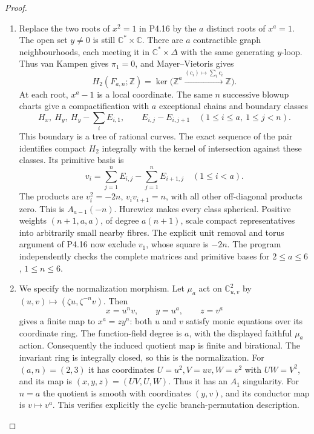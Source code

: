 \begin{proof}

\begin{enumerate}[label={$\langle1\rangle$\arabic*.},leftmargin=*]
\item Replace the two roots of $x^2=1$ in P4.16 by the $a$ distinct
roots of $x^a=1$. The open set $y\ne0$ is still
$\mathbb C^*\times\mathbb C$. There are $a$ contractible graph
neighbourhoods, each meeting it in $\mathbb C^*\times\Delta$
with the same generating $y$-loop. Thus van Kampen gives
$\pi_1=0$, and Mayer--Vietoris gives
\[
 H_2(F_{a,n};\mathbb Z)=\ker\bigl(\mathbb Z^a
   \xrightarrow{(c_i)\mapsto\sum_i c_i}\mathbb Z\bigr).
\]
At each root, $x^a-1$ is a local coordinate. The same $n$
successive blowup charts give a compactification with $a$
exceptional chains and boundary classes
\[
 H_x,\ H_y,\ H_y-\sum_i E_{i,1},\qquad
 E_{i,j}-E_{i,j+1}\quad(1\leq i\leq a,\ 1\leq j<n).
\]
This boundary is a tree of rational curves. The exact sequence
of the pair identifies compact $H_2$ integrally with the kernel
of intersection against these classes. Its primitive basis is
\[
 v_i=\sum_{j=1}^n E_{i,j}-\sum_{j=1}^n E_{i+1,j}
       \quad(1\leq i<a).
\]
The products are $v_i^2=-2n$, $v_iv_{i+1}=n$, with all other
off-diagonal products zero. This is $A_{a-1}(-n)$.
Hurewicz makes every class spherical. Positive weights
$(n+1,a,a)$, of degree $a(n+1)$, scale compact representatives
into arbitrarily small nearby fibres. The explicit unit removal
and torus argument of P4.16 now exclude $v_1$, whose square
is $-2n$. The program independently checks the complete
matrices and primitive bases for $2\leq a\leq6$, $1\leq n\leq6$.

\item We specify the normalization morphism. Let $\mu_a$ act on
$\mathbb C^2_{u,v}$ by $(u,v)\mapsto(\zeta u,\zeta^{-n}v)$.
Then
\[
 x=u^nv,\qquad y=u^a,\qquad z=v^a
\]
gives a finite map to $x^a=zy^n$: both $u$ and $v$ satisfy
monic equations over its coordinate ring. The function-field
degree is $a$, with the displayed faithful $\mu_a$ action.
Consequently the induced quotient map is finite and birational.
The invariant ring is integrally closed, so this is the
normalization. For $(a,n)=(2,3)$ it has coordinates
$U=u^2,V=uv,W=v^2$ with $UW=V^2$, and its map is
$(x,y,z)=(UV,U,W)$. Thus it has an $A_1$ singularity.
For $n=a$ the quotient is smooth with coordinates $(y,v)$,
and its conductor map is $v\mapsto v^a$. This verifies
explicitly the cyclic branch-permutation description.

\end{enumerate}
\end{proof}

